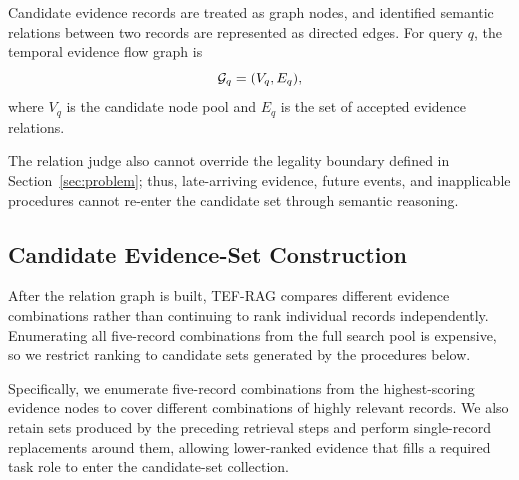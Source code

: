 Candidate evidence records are treated as graph nodes, and identified semantic relations between two records are represented as directed edges. For query $q$, the temporal evidence flow graph is
\begin{equation}
\mathcal{G}_q=(V_q,E_q),
\end{equation}
where $V_q$ is the candidate node pool and $E_q$ is the set of accepted evidence relations. 


 The relation judge also cannot override the legality boundary defined in Section~\ref{sec:problem}; thus, late-arriving evidence, future events, and inapplicable procedures cannot re-enter the candidate set through semantic reasoning.

\subsection{Candidate Evidence-Set Construction}

After the relation graph is built, TEF-RAG compares different evidence combinations rather than continuing to rank individual records independently. Enumerating all five-record combinations from the full search pool is expensive, so we restrict ranking to candidate sets generated by the procedures below.

Specifically, we enumerate five-record combinations from the highest-scoring evidence nodes to cover different combinations of highly relevant records. We also retain sets produced by the preceding retrieval steps and perform single-record replacements around them, allowing lower-ranked evidence that fills a required task role to enter the candidate-set collection.

